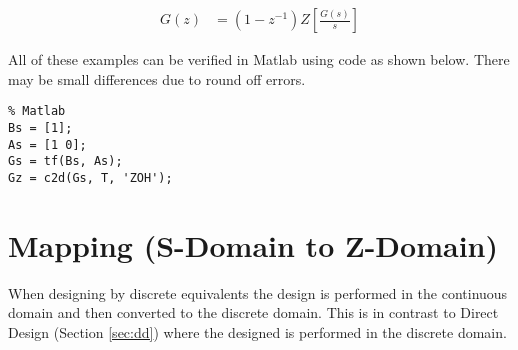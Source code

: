 \documentclass{article}
\newcommand{\sincludepdf}[2][]{
	
}
\begin{document}
\begin{align}
	G(z) &= (1 - z^{-1}) Z \left[ \frac{G(s)}{s} \right]
\end{align}

All of these examples can be verified in Matlab using
code as shown below.
There may be small differences due to round off errors.

\begin{lstlisting}
% Matlab
Bs = [1];
As = [1 0];
Gs = tf(Bs, As);
Gz = c2d(Gs, T, 'ZOH');
\end{lstlisting}

\sincludepdf[pages={8},
			pagecommand=\subsection*{Example 1}
	]{scan/11211301.pdf}

\sincludepdf[pages={6},
			pagecommand=\subsection*{Example 2}
		]{scan/11221301.pdf}
\sincludepdf[pages={7}]{scan/11221301.pdf}

\sincludepdf[pages={1},
			pagecommand=\subsection*{Example 3}
		]{scan/11221301.pdf}
\sincludepdf[pages={2}]{scan/11221301.pdf}

\sincludepdf[pages={1},
			pagecommand=\subsection*{Example 4}
		]{scan/11241301.pdf}
\sincludepdf[pages={2}]{scan/11241301.pdf}

\sincludepdf[pages={1},
			pagecommand=\subsection*{Example 5}
		]{scan/11251301.pdf}
\sincludepdf[pages={2}]{scan/11251301.pdf}


\section{Mapping (S-Domain to Z-Domain)}
\label{sec:mapping}

When designing by discrete equivalents the design is performed
in the continuous domain and then converted to the discrete domain.
This is in contrast to Direct Design (Section \ref{sec:dd}) where
the designed is performed in the discrete domain.
\end{document}
